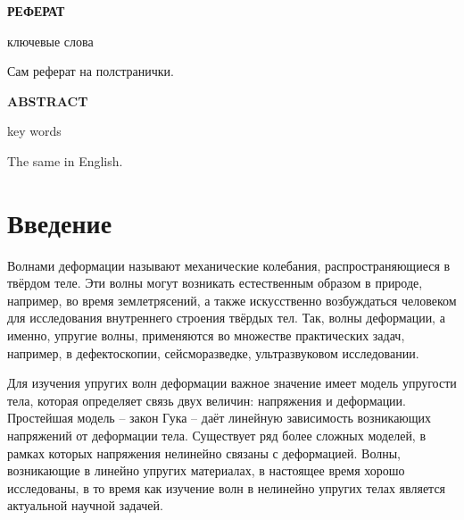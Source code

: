 \documentclass[12pt, a4paper]{report}
\begin{document}
\newpage


\newpage
\thispagestyle{empty}
\begin{center}
	\textbf{РЕФЕРАТ}
\end{center}
ключевые слова

Сам реферат на полстранички.

\begin{center}
	\textbf{ABSTRACT}
\end{center}
key words

The same in English.


\newpage
\setcounter{page}{4}
\tableofcontents



\chapter*{Введение}

Волнами деформации называют механические колебания, распространяющиеся в твёрдом теле. Эти волны могут возникать естественным образом в природе, например, во время землетрясений, а также искусственно возбуждаться человеком для исследования внутреннего строения твёрдых тел. Так, волны деформации, а именно, упругие волны, применяются во множестве практических задач, например, в дефектоскопии, сейсморазведке, ультразвуковом исследовании.

Для изучения упругих волн деформации важное значение имеет модель упругости тела, которая определяет связь двух величин: напряжения и деформации. Простейшая модель -- закон Гука -- даёт линейную зависимость возникающих напряжений от деформации тела. 
Существует ряд более сложных моделей, 
в рамках которых напряжения нелинейно связаны с деформацией. 
Волны, возникающие в линейно упругих материалах, в настоящее время хорошо исследованы, в то время как изучение волн в нелинейно упругих телах является актуальной научной задачей.
\end{document}
